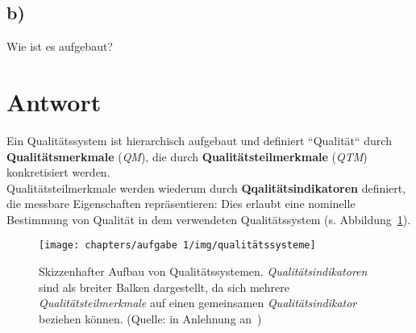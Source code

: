 \subsection*{b)}
Wie ist es aufgebaut?

\section*{Antwort}
Ein Qualitätssystem ist hierarchisch aufgebaut und definiert ``Qualität`` durch \textbf{Qualitätsmerkmale} (\textit{QM}), die durch \textbf{Qualitätsteilmerkmale} (\textit{QTM}) konkretisiert werden.\\
Qualitätsteilmerkmale werden wiederum durch \textbf{Qqalitätsindikatoren} definiert, die messbare Eigenschaften repräsentieren: Dies erlaubt eine nominelle Bestimmung von Qualität in dem verwendeten Qualitätssystem (s. Abbildung~\ref{fig:qualitätssysteme}).

\begin{figure}
    \centering
    \texttt{[image: chapters/aufgabe 1/img/qualitätssysteme]}
    \caption{Skizzenhafter Aufbau von Qualitätssystemen. \textit{Qualitätsindikatoren} sind als breiter Balken dargestellt, da sich mehrere \textit{Qualitätsteilmerkmale} auf einen gemeinsamen \textit{Qualitätsindikator} beziehen können. (Quelle: in Anlehnung an~\cite[Abb. 1.1, 3]{Wed09c})}
    \label{fig:qualitätssysteme}
\end{figure}

